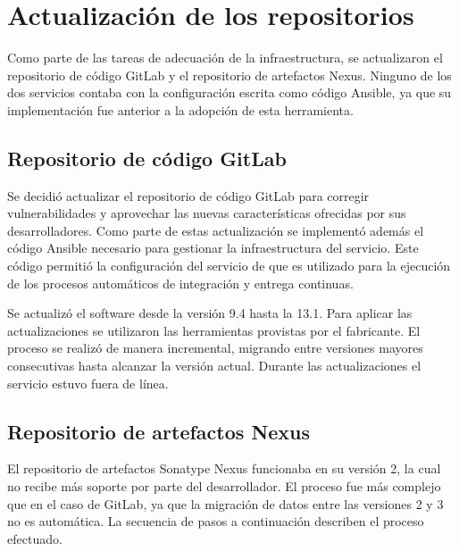 \section{Actualización de los repositorios}

Como parte de las tareas de adecuación de la infraestructura, se
actualizaron el repositorio de código GitLab y el repositorio de
artefactos Nexus. Ninguno de los dos servicios contaba con la
configuración escrita como código Ansible, ya que su implementación
fue anterior a la adopción de esta herramienta.

\subsection{Repositorio de código GitLab}

Se decidió actualizar el repositorio de código GitLab para corregir
vulnerabilidades y aprovechar las nuevas características ofrecidas por
sus desarrolladores. Como parte de estas actualización se implementó
además el código Ansible necesario para gestionar la infraestructura
del servicio. Este código permitió la configuración del servicio de
 que es utilizado para la ejecución de los procesos
automáticos de integración y entrega continuas.

Se actualizó el software desde la versión 9.4 hasta la 13.1. Para
aplicar las actualizaciones se utilizaron las herramientas provistas
por el fabricante. El proceso se realizó de manera incremental,
migrando entre versiones mayores consecutivas hasta alcanzar la
versión actual. Durante las actualizaciones el servicio estuvo fuera
de línea.

\subsection{Repositorio de artefactos Nexus}

El repositorio de artefactos Sonatype Nexus funcionaba en su versión
2, la cual no recibe más soporte por parte del desarrollador. El
proceso fue más complejo que en el caso de GitLab, ya que la migración
de datos entre las versiones 2 y 3 no es automática. La secuencia de
pasos a continuación describen el proceso efectuado.

